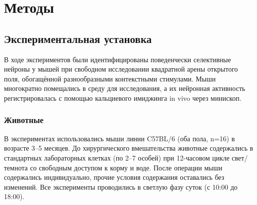 \section{Методы}
\label{sec:methods}

\subsection{Экспериментальная установка}
\label{sec:experimental_setup}
В ходе экспериментов были идентифицированы поведенчески селективные нейроны у мышей при свободном исследовании квадратной арены открытого поля, обогащённой разнообразными контекстными стимулами. Мыши многократно помещались в среду для исследования, а их нейронная активность регистрировалась с помощью кальциевого имиджинга in vivo через минископ.

\subsubsection{Животные}
\label{sec:animals}
В экспериментах использовались мыши линии C57BL/6 (оба пола, n=16) в возрасте 3--5 месяцев. До хирургического вмешательства животные содержались в стандартных лабораторных клетках (по 2--7 особей) при 12-часовом цикле свет/темнота со свободным доступом к корму и воде. После операции мыши содержались индивидуально, прочие условия содержания оставались без изменений. Все эксперименты проводились в светлую фазу суток (с 10:00 до 18:00).


